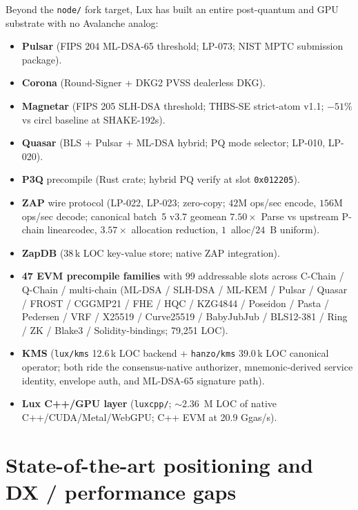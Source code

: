 \documentclass[11pt,a4paper]{article}
\begin{document}
Beyond the \texttt{node/} fork target, Lux has built an entire
post-quantum and GPU substrate with no Avalanche analog:

\begin{itemize}[leftmargin=1.4em,topsep=0.2em,itemsep=0.1em]
  \item \textbf{Pulsar} (FIPS 204 ML-DSA-65 threshold; LP-073;
        NIST MPTC submission package).
  \item \textbf{Corona} (Round-Signer + DKG2 PVSS dealerless DKG).
  \item \textbf{Magnetar} (FIPS 205 SLH-DSA threshold; THBS-SE
        strict-atom v1.1; $-51\%$ vs circl baseline at SHAKE-192s).
  \item \textbf{Quasar} (BLS + Pulsar + ML-DSA hybrid; PQ mode
        selector; LP-010, LP-020).
  \item \textbf{P3Q} precompile (Rust crate; hybrid PQ verify at slot
        \texttt{0x012205}).
  \item \textbf{ZAP} wire protocol (LP-022, LP-023; zero-copy;
        $42$M ops/sec encode, $156$M ops/sec decode; canonical batch~5
        v3.7 geomean $7.50\times$ Parse vs upstream P-chain
        linearcodec, $3.57\times$ allocation reduction, $1$~alloc/$24$~B
        uniform).
  \item \textbf{ZapDB} (38\,k LOC key-value store; native ZAP
        integration).
  \item \textbf{47 EVM precompile families} with $99$ addressable
        slots across C-Chain / Q-Chain / multi-chain (ML-DSA /
        SLH-DSA / ML-KEM / Pulsar / Quasar / FROST / CGGMP21 / FHE /
        HQC / KZG4844 / Poseidon / Pasta / Pedersen / VRF / X25519 /
        Curve25519 / BabyJubJub / BLS12-381 / Ring / ZK / Blake3 /
        Solidity-bindings; 79{,}251 LOC).
  \item \textbf{KMS} (\texttt{lux/kms} 12.6\,k LOC backend +
        \texttt{hanzo/kms} 39.0\,k LOC canonical operator; both ride
        the consensus-native authorizer, mnemonic-derived service
        identity, envelope auth, and ML-DSA-65 signature path).
  \item \textbf{Lux C++/GPU layer} (\texttt{luxcpp/}; $\sim$2.36~M
        LOC of native C++/CUDA/Metal/WebGPU; C++ EVM at 20.9 Ggas/s).
\end{itemize}





\section{State-of-the-art positioning and DX / performance gaps}
\label{sec:gaps}
\end{document}

